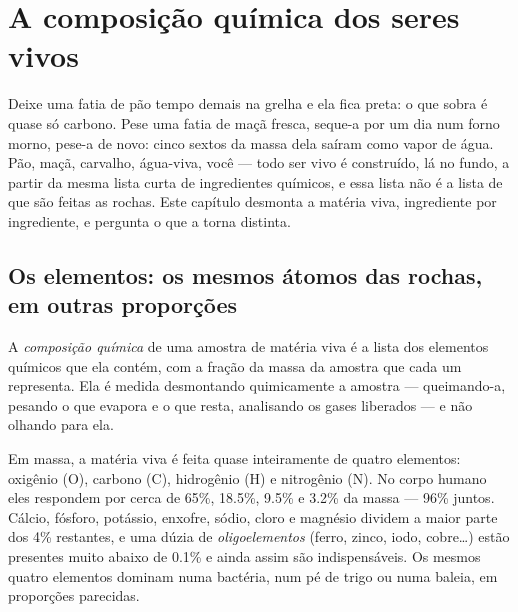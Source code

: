 \chapter{A composição química dos seres vivos}\label{ch:g10:chemistry-of-life}

Deixe uma fatia de pão tempo demais na grelha e ela fica preta: o que
sobra é quase só carbono. Pese uma fatia de maçã fresca, seque-a por um
dia num forno morno, pese-a de novo: cinco sextos da massa dela saíram
como vapor de água. Pão, maçã, carvalho, água-viva, você --- todo ser
vivo é construído, lá no fundo, a partir da mesma lista curta de
ingredientes químicos, e essa lista não é a lista de que são feitas as
rochas. Este capítulo desmonta a matéria viva, ingrediente por
ingrediente, e pergunta o que a torna distinta.

\section{Os elementos: os mesmos átomos das rochas, em outras proporções}

\begin{definition}\label{def:g10:chemistry-of-life:composition}
A \emph{composição química} de uma amostra de
matéria viva é a lista dos elementos químicos que ela contém, com a
fração da massa da amostra que cada um representa. Ela é medida
desmontando quimicamente a amostra --- queimando-a, pesando o que
evapora e o que resta, analisando os gases liberados --- e não olhando
para ela.
\end{definition}

\begin{proposition}\label{prop:g10:chemistry-of-life:four}
Em massa, a matéria viva é feita quase inteiramente de quatro
elementos: oxigênio (O), carbono (C), hidrogênio (H) e nitrogênio (N).
No corpo humano eles respondem por cerca de 65\%, 18.5\%, 9.5\% e 3.2\%
da massa --- 96\% juntos. Cálcio, fósforo, potássio, enxofre, sódio,
cloro e magnésio dividem a maior parte dos 4\% restantes, e uma dúzia de
\emph{oligoelementos} (ferro, zinco, iodo, cobre\dots) estão presentes
muito abaixo de 0.1\% e ainda assim são indispensáveis. Os mesmos quatro
elementos dominam numa bactéria, num pé de trigo ou numa baleia, em
proporções parecidas.
\end{proposition}
\admitted


